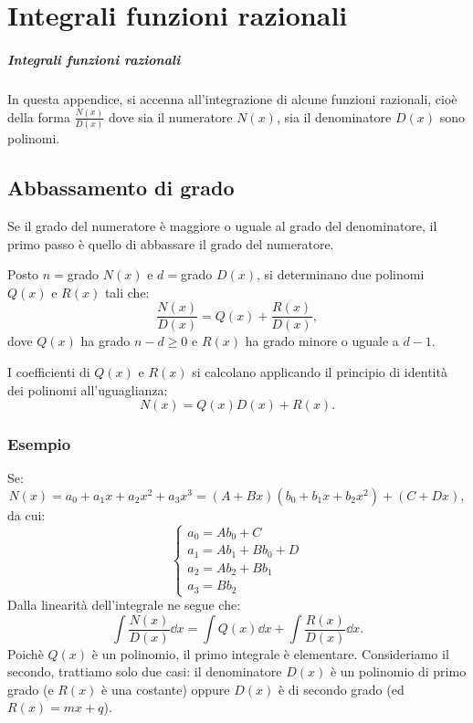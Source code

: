 
\chapter{Integrali funzioni razionali} %

\label{ch:integrali-e} %

\paragraph{Integrali funzioni razionali}
In questa appendice, si accenna all'integrazione di alcune funzioni razionali, cioè della forma $\frac{N(x)}{D(x)}$ dove sia il numeratore $N(x)$, sia il denominatore $D(x)$ sono polinomi.

\section{Abbassamento di grado}
Se il grado del numeratore è maggiore o uguale al grado del denominatore, il primo passo è quello di abbassare il grado del numeratore.

Posto $n=$grado $N(x)$ e $d=$grado $D(x)$, si determinano due polinomi $Q(x)$ e $R(x)$ tali che:
\[\frac{N(x)}{D(x)}=Q(x)+\frac{R(x)}{D(x)},\]
dove $Q(x)$ ha grado $n-d\geq0$ e $R(x)$ ha grado minore o uguale a $d-1$.

I coefficienti di $Q(x)$ e $R(x)$ si calcolano applicando il principio di identità dei polinomi all'uguaglianza:
\[N(x)=Q(x)D(x)+R(x).\]

\subsection{Esempio}
Se:
\[N(x)=a_0+a_1x+a_2x^2+a_3x^3=(A+Bx)(b_0+b_1x+b_2x^2)+(C+Dx),\]
da cui:
\[\begin{cases}
a_0 = Ab_0+C \\
a_1 = Ab_1+Bb_0+D \\
a_2 = Ab_2+Bb_1 \\
a_3 = Bb_2
\end{cases}\]
Dalla linearità dell'integrale ne segue che:
\[\int\frac{N(x)}{D(x)}\dd x=\int Q(x)\dd x+\int\frac{R(x)}{D(x)}\dd x.\]
Poichè $Q(x)$ è un polinomio, il primo integrale è elementare.
Consideriamo il secondo, trattiamo solo due casi: il denominatore $D(x)$ è un polinomio di primo grado (e $R(x)$ è una costante) oppure $D(x)$ è di secondo grado (ed $R(x)=mx+q$).


